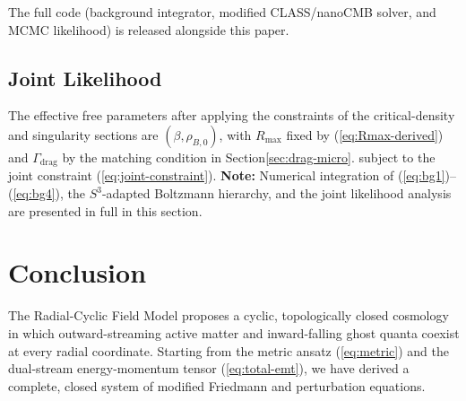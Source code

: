 \documentclass[10pt,twocolumn]{article}
\theoremstyle{definition}
\newcommand{\Rmax}{R_{\max}}
\newcommand{\Gammadrag}{\Gamma_{\mathrm{drag}}}
\begin{document}
The full code (background integrator, modified CLASS/nanoCMB solver, and MCMC likelihood) is released alongside this paper.



\subsection{Joint Likelihood}

The effective free parameters after applying the
constraints of the critical-density and singularity sections
are \( (\beta,\rho_{B,0}) \),
with \( \Rmax \) fixed by (\ref{eq:Rmax-derived}) and
\( \Gammadrag \) by the matching condition in Section\~\ref{sec:drag-micro}.
subject to the joint constraint (\ref{eq:joint-constraint}).
\noindent
\textbf{Note:} Numerical integration of (\ref{eq:bg1})--(\ref{eq:bg4}),
the \(S^3\)-adapted Boltzmann hierarchy, and the joint likelihood analysis are presented in full in this section.





\section{Conclusion}
\label{sec:conc}

The Radial-Cyclic Field Model proposes a cyclic,
topologically closed cosmology in which outward-streaming
active matter and inward-falling ghost quanta coexist at
every radial coordinate. Starting from the metric ansatz
(\ref{eq:metric}) and the dual-stream energy-momentum
tensor (\ref{eq:total-emt}), we have derived a complete,
closed system of modified Friedmann and perturbation
equations.
\end{document}

